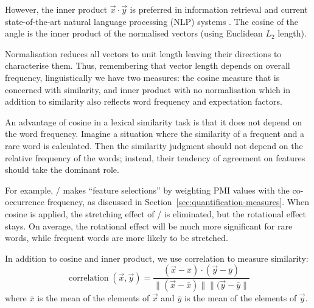 However, the inner product $\vec{x} \cdot \vec{y}$ is preferred in information retrieval and current state-of-the-art natural language processing (NLP) systems \cite{mikolov2013distributed,mikolov2013linguistic,TACL570}. The cosine of the angle is the inner product of the normalised vectors (using Euclidean $L_2$ length).
%
%

Normalisation reduces all vectors to unit length leaving their directions to characterise them. Thus, remembering that vector length depends on overall frequency, linguistically we have two measures: the cosine measure that is concerned with similarity, and inner product with no normalisation which in addition to similarity also reflects word frequency and expectation factors.
%
%

An advantage of cosine in a lexical similarity task is that it does not depend on the word frequency. Imagine a situation where the similarity of a frequent and a rare word is calculated. Then the similarity judgment should not depend on the relative frequency of the words; instead, their tendency of agreement on features should take the dominant role.

For example, \NPMI/ makes ``feature selections'' by weighting PMI values with the co-occurrence frequency, as discussed in Section~\ref{sec:quantification-measures}. When cosine is applied, the stretching effect of \NPMI/ is eliminated, but the rotational effect stays. On average, the rotational effect will be much more significant for rare words, while frequent words are more likely to be stretched.

In addition to cosine and inner product, we use correlation \cite{kiela-clark:2014:CVSC} to measure similarity:
\begin{equation*}
  \label{eq:correlation}
  \operatorname{correlation}(\vec{x}, \vec{y}) = \frac{(\vec{x} - \bar{x}) \cdot (\vec{y} - \bar{y})}
                                {\|(\vec{x} - \bar{x})\| \|(\vec{y}-\bar{y}\|}
\end{equation*}
where $\bar{x}$ is the mean of the elements of $\vec{x}$ and $\bar{y}$ is the mean of the elements of $\vec{y}$.


